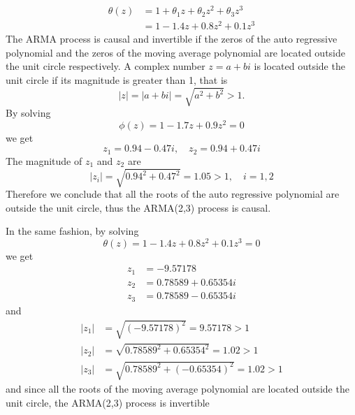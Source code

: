 \documentclass[11pt, oneside]{article}   	%
\begin{document}
\begin{equation}\label{eq:ma}
\begin{aligned}
\theta(z) &= 1+\theta_{1}z+\theta_{2}z^{2}+\theta_{3}z^{3} \\
             &= 1-1.4z+0.8z^{2}+0.1z^{3}
\end{aligned}    
\end{equation}
The ARMA process is causal and invertible if the zeros of the auto regressive polynomial and the zeros of the moving average polynomial are located outside the unit circle respectively.
A complex number $z = a+bi$ is located outside the unit circle if its magnitude is greater than 1, that is 
\begin{equation}
|z|= |a+bi|= \sqrt{a^{2} + b^{2}} > 1. \nonumber
\end{equation}
By solving 
\begin{equation}
\phi(z) = 1-1.7z+0.9z^{2} = 0 \nonumber
\end{equation}
we get
\begin{equation}
z_{1} = 0.94-0.47i, \quad z_{2} = 0.94+0.47i  \nonumber
\end{equation}
The magnitude of $z_{1}$ and $z_{2}$ are 
\begin{equation}
|z_{i}| = \sqrt{0.94^{2} + 0.47^{2}} = 1.05 > 1, \quad i = 1,2\nonumber
\end{equation}
Therefore we conclude that all the roots of the auto regressive polynomial are outside the unit circle, thus the ARMA(2,3) process is causal.

\begin{flushleft}
In the same fashion, by solving 
\begin{equation}
\theta(z) = 1-1.4z+0.8z^{2}+0.1z^{3} = 0 \nonumber
\end{equation}
we get
\begin{equation}
\begin{aligned}
z_{1} &= -9.57178\\
z_{2} &= 0.78589 + 0.65354i\\
z_{3} &= 0.78589 - 0.65354i \nonumber
\end{aligned}
\end{equation}
and 
\begin{equation}
\begin{aligned}
|z_{1}| &= \sqrt{(-9.57178)^{2}} =9.57178 > 1 \\
|z_{2}| &= \sqrt{0.78589^{2} + 0.65354^{2}}=1.02 > 1\\
|z_{3}| &= \sqrt{0.78589^{2} + (-0.65354)^{2}}=1.02 >1 \nonumber
\end{aligned}
\end{equation}
and since all the roots of the moving average polynomial are located outside the unit circle, the ARMA(2,3) process is invertible
\end{flushleft}
\end{document}
